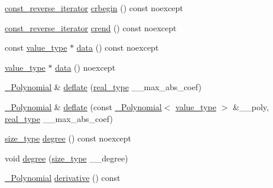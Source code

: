 \begin{DoxyCompactItemize}
\item 
\hyperlink{class____gnu__cxx_1_1__Polynomial_a2a042a80127ab9a7b0349a54791e59af}{const\+\_\+reverse\+\_\+iterator} \hyperlink{class____gnu__cxx_1_1__Polynomial_a263b74157472085ae2fb01957a5bda5e}{crbegin} () const noexcept
\item 
\hyperlink{class____gnu__cxx_1_1__Polynomial_a2a042a80127ab9a7b0349a54791e59af}{const\+\_\+reverse\+\_\+iterator} \hyperlink{class____gnu__cxx_1_1__Polynomial_a0b314ced62a607798572646a76f2ac35}{crend} () const noexcept
\item 
const \hyperlink{class____gnu__cxx_1_1__Polynomial_a725563351f50e76084a7a016c06f8a53}{value\+\_\+type} $\ast$ \hyperlink{class____gnu__cxx_1_1__Polynomial_a85ee127ade1524a130ac9be44d80a770}{data} () const noexcept
\item 
\hyperlink{class____gnu__cxx_1_1__Polynomial_a725563351f50e76084a7a016c06f8a53}{value\+\_\+type} $\ast$ \hyperlink{class____gnu__cxx_1_1__Polynomial_a6a4d5e285aaf5e40fa54274e6dee558d}{data} () noexcept
\item 
\hyperlink{class____gnu__cxx_1_1__Polynomial}{\+\_\+\+Polynomial} \& \hyperlink{class____gnu__cxx_1_1__Polynomial_a919fb67d8a4aa72952e6bbea7b5bc967}{deflate} (\hyperlink{class____gnu__cxx_1_1__Polynomial_a656ceaafcb42abd626c253da3284998b}{real\+\_\+type} \+\_\+\+\_\+max\+\_\+abs\+\_\+coef)
\item 
\hyperlink{class____gnu__cxx_1_1__Polynomial}{\+\_\+\+Polynomial} \& \hyperlink{class____gnu__cxx_1_1__Polynomial_a7fa3113b29a710d74beb4ccdaadf4411}{deflate} (const \hyperlink{class____gnu__cxx_1_1__Polynomial}{\+\_\+\+Polynomial}$<$ \hyperlink{class____gnu__cxx_1_1__Polynomial_a725563351f50e76084a7a016c06f8a53}{value\+\_\+type} $>$ \&\+\_\+\+\_\+poly, \hyperlink{class____gnu__cxx_1_1__Polynomial_a656ceaafcb42abd626c253da3284998b}{real\+\_\+type} \+\_\+\+\_\+max\+\_\+abs\+\_\+coef)
\item 
\hyperlink{class____gnu__cxx_1_1__Polynomial_a8b25fcfd4acaad0c5c08b649c22da28a}{size\+\_\+type} \hyperlink{class____gnu__cxx_1_1__Polynomial_a07d9933aeeb9afbd823218ed921336cb}{degree} () const noexcept
\item 
void \hyperlink{class____gnu__cxx_1_1__Polynomial_af6ae7990b6185dc3597a8a5d6abdd13a}{degree} (\hyperlink{class____gnu__cxx_1_1__Polynomial_a8b25fcfd4acaad0c5c08b649c22da28a}{size\+\_\+type} \+\_\+\+\_\+degree)
\item 
\hyperlink{class____gnu__cxx_1_1__Polynomial}{\+\_\+\+Polynomial} \hyperlink{class____gnu__cxx_1_1__Polynomial_a69e973ccaf5857251a8b7971e19a5ec7}{derivative} () const

\end{DoxyCompactItemize}
